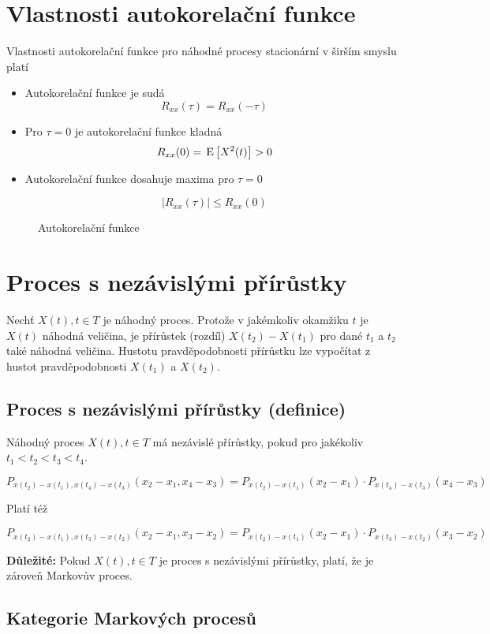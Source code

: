 \section{Vlastnosti autokorelační funkce}
Vlastnosti autokorelační funkce pro náhodné procesy stacionární v širším smyslu platí

\begin{itemize}
\item Autokorelační funkce je sudá
\[ R_{xx}(\tau)=R_{xx}(-\tau) \]

\item Pro $\tau=0$ je autokorelační funkce kladná
\[ R_{xx}(0) = \,\mathrm{E}\left[X^2(t)\right]>0 \]

\item Autokorelační funkce dosahuje maxima pro $\tau=0$

\[ |R_{xx}(\tau)|\leq R_{xx}(0) \]
\end{itemize}

\begin{figure}
\caption{Autokorelační funkce}
\end{figure}

\section{Proces s nezávislými přírůstky}
Nechť $X(t),t\in T$ je náhodný proces. Protože v jakémkoliv okamžiku $t$ je $X(t)$ náhodná veličina, je přírůstek (rozdíl) $X(t_2)-X(t_1)$ pro dané $t_1$ a $t_2$ také náhodná veličina. Hustotu pravděpodobnosti přírůstku lze vypočítat z hustot pravděpodobnosti $X(t_1)$ a $X(t_2)$.

\subsection{Proces s nezávislými přírůstky (definice)}
Náhodný proces $X(t),t\in T$ má nezávislé přírůstky, pokud pro jakékoliv $t_1<t_2<t_3<t_4$.

\[ P_{x(t_2)-x(t_1),x(t_4)-x(t_3)}(x_2-x_1,x_4-x_3)=P_{x(t_2)-x(t_1)}(x_2-x_1)\cdot P_{x(t_4)-x(t_3)}(x_4-x_3) \]

Platí též

\[ P_{x(t_2)-x(t_1),x(t_3)-x(t_2)}(x_2-x_1,x_3-x_2) = P_{x(t_2)-x(t_1)}(x_2-x_1)\cdot P_{x(t_3)-x(t_2)}(x_3-x_2) \]

\textbf{Důležité:} Pokud $X(t),t\in T$ je proces s nezávislými přírůstky, platí, že je zároveň Markovův proces.

\subsection{Kategorie Markových procesů}

